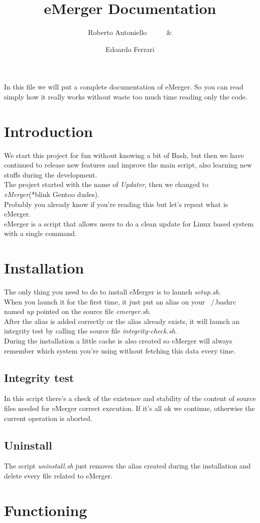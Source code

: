 \documentclass{article}
\author{
  Roberto Antoniello \ \ \ \ \ \&
  \and
  Edoardo Ferrari} %
\title{eMerger Documentation} %
\begin{document}
\maketitle %

\begin{center}In this file we will put a complete documentation of eMerger. So you can read simply how it really works without waste too much time reading only the code.
\end{center}

\section{Introduction}
We start this project for fun without knowing a bit of Bash, but then we have continued to release new features and improve the main script, also learning new stuffs during the development.\\
The project started with the name of \textit{Updater}, then we changed to \textit{eMerger}(*blink Gentoo dudes).\\
Probably you already know if you're reading this but let's repeat what is eMerger.\\
eMerger is a script that allows users to do a clean update for Linux based system with a single command. 

\section{Installation}
The only thing you need to do to install eMerger is to launch \textit{setup.sh}.\\
When you launch it for the first time, it just put an alias on your ~/.bashrc named \textit{up} pointed on the source file \textit{emerger.sh}. \\
After the alias is added correctly  or the alias already exists, it will launch an integrity test by calling the source file \textit{integrity-check.sh}.\\
During the installation a little cache is also created so eMerger will always remember which system you're using without fetching this data every time.

\subsection{Integrity test}
In this script there's a check of the existence and stability of the content of source files needed for eMerger correct execution. If it's all ok we continue, otherwise the current operation is aborted.

\subsection{Uninstall}
The script \textit{uninstall.sh} just removes the alias created during the installation and delete every file related to eMerger.
\section{Functioning}
\end{document}
